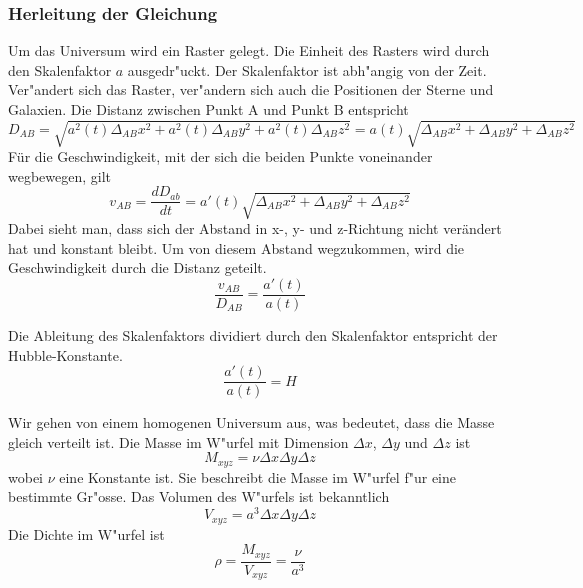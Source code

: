 \begin{refsection}
\subsubsection{Herleitung der Gleichung}
Um das Universum wird ein Raster gelegt. Die Einheit des Rasters wird durch den Skalenfaktor $a$ ausgedr"uckt. Der Skalenfaktor ist abh"angig von der Zeit. Ver"andert sich das Raster, ver"andern sich auch die Positionen der Sterne und Galaxien.
Die Distanz zwischen Punkt A und Punkt B entspricht 
\begin{equation}
D_{AB} = \sqrt{a^2(t)\Delta_{AB}x^2 + a^2(t)\Delta_{AB}y^2 + a^2(t)\Delta_{AB}z^2} = a(t) \sqrt{\Delta_{AB}x^2 + \Delta_{AB}y^2 + \Delta_{AB}z^2}
\end{equation}
F\"{u}r die Geschwindigkeit, mit der sich die beiden Punkte voneinander wegbewegen, gilt 
\begin{equation}
v_{AB} = \dfrac{dD_{ab}}{dt} 
	   = a'(t) \sqrt{\Delta_{AB}x^2 + \Delta_{AB}y^2 + \Delta_{AB}z^2}
\end{equation}
Dabei sieht man, dass sich der Abstand in x-, y- und z-Richtung nicht ver\"{a}ndert hat und konstant bleibt. Um von diesem Abstand wegzukommen, wird die Geschwindigkeit durch die Distanz geteilt.
\begin{equation}
\frac{v_{AB} }{D_{AB}} = \frac{a'(t)}{a(t)}
\end{equation}
\begin{satz} 
	Die Ableitung des Skalenfaktors dividiert durch den Skalenfaktor entspricht der Hubble-Konstante.
	\[
	\frac{a'(t)}{a(t)} = H
	\]
\end{satz}
Wir gehen von einem homogenen Universum aus, was bedeutet, dass die Masse gleich verteilt ist. Die Masse im W"urfel mit Dimension $\Delta x$, $\Delta y$ und $\Delta z$ ist 
\begin{equation}
M_{xyz} = \nu \Delta x \Delta y \Delta z
\end{equation}
wobei $\nu$ eine Konstante ist. Sie beschreibt die Masse im W"urfel f"ur eine bestimmte Gr"osse. Das Volumen des W"urfels ist bekanntlich 
\begin{equation}
V_{xyz} = a^3 \Delta x \Delta y \Delta z
\end{equation}
Die Dichte im W"urfel ist  
\begin{equation}
\rho = \frac{M_{xyz}}{V_{xyz}} = \frac{\nu}{a^3}
\label{friedmann:dichte}
\end{equation}

\end{refsection}
